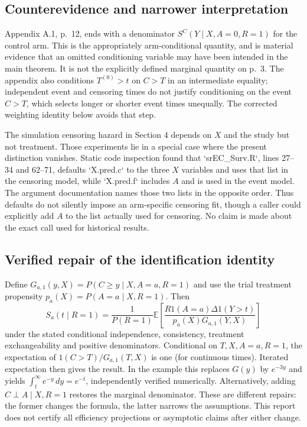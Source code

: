 \documentclass[10pt]{article}
\begin{document}
\subsection*{Counterevidence and narrower interpretation}
Appendix A.1, p. 12, ends with a denominator \(S^C(Y\mid X,A=0,R=1)\) for the control arm. This is the appropriately arm-conditional quantity, and is material evidence that an omitted conditioning variable may have been intended in the main theorem. It is not the explicitly defined marginal quantity on p. 3. The appendix also conditions \(T^{(0)}>t\) on \(C>T\) in an intermediate equality; independent event and censoring times do not justify conditioning on the event \(C>T\), which selects longer or shorter event times unequally. The corrected weighting identity below avoids that step.\par
The simulation censoring hazard in Section 4 depends on \(X\) and the study but not treatment. Those experiments lie in a special case where the present distinction vanishes. Static code inspection found that `srEC\_Surv.R`, lines 27–34 and 62–71, defaults `X.pred.c` to the three \(X\) variables and uses that list in the censoring model, while `X.pred.f` includes \(A\) and is used in the event model. The argument documentation names those two lists in the opposite order. Thus defaults do not silently impose an arm-specific censoring fit, though a caller could explicitly add \(A\) to the list actually used for censoring. No claim is made about the exact call used for historical results.\par
\subsection*{Verified repair of the identification identity}
Define \(G_{a,1}(y,X)=P(C\ge y\mid X,A=a,R=1)\) and use the trial treatment propensity \(p_a(X)=P(A=a\mid X,R=1)\). Then \[S_a(t\mid R=1)=\frac1{P(R=1)}\mathbb E\!\left[\frac{R1(A=a)\Delta1(Y>t)}{p_a(X)G_{a,1}(Y,X)}\right]\] under the stated conditional independence, consistency, treatment exchangeability and positive denominators. Conditional on \(T,X,A=a,R=1\), the expectation of \(1(C>T)/G_{a,1}(T,X)\) is one (for continuous times). Iterated expectation then gives the result. In the example this replaces \(G(y)\) by \(e^{-3y}\) and yields \(\int_t^\infty e^{-y}\,dy=e^{-t}\), independently verified numerically. Alternatively, adding \(C\perp A\mid X,R=1\) restores the marginal denominator. These are different repairs: the former changes the formula, the latter narrows the assumptions. This report does not certify all efficiency projections or asymptotic claims after either change.\par
\end{document}

